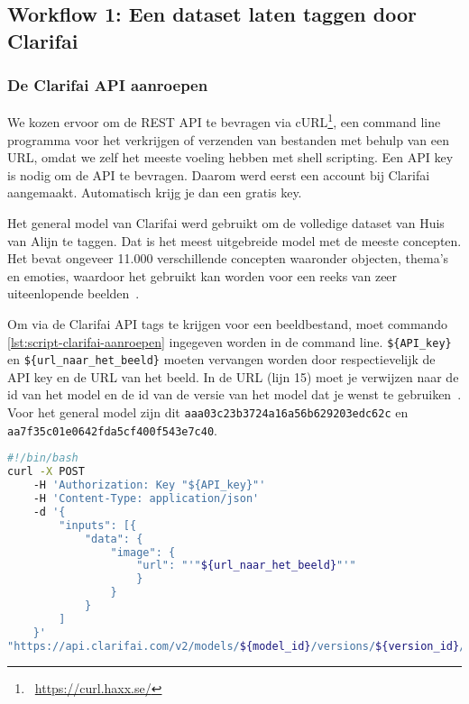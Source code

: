\subsection{Workflow 1: Een dataset laten taggen door Clarifai}
\label{subsec:workflow1}

\subsubsection{De Clarifai API aanroepen}
\label{(subsubsec:clarifai-aanroepen)}

We kozen ervoor om de REST API te bevragen via cURL\footnote{~\url{https://curl.haxx.se/}}, een command line programma voor het verkrijgen of verzenden van bestanden met behulp van een URL, omdat we zelf het meeste voeling hebben met shell scripting. Een API key is nodig om de API te bevragen. Daarom werd eerst een account bij Clarifai aangemaakt. Automatisch krijg je dan een gratis key. 

Het general model van Clarifai werd gebruikt om de volledige dataset van Huis van Alijn te taggen. Dat is het meest uitgebreide model met de meeste concepten. Het bevat ongeveer 11.000 verschillende concepten waaronder objecten, thema's en emoties, waardoor het gebruikt kan worden voor een reeks van zeer uiteenlopende beelden~\autocite{ClarifaiGeneral}.

Om via de Clarifai API tags te krijgen voor een beeldbestand, moet commando \ref{lst:script-clarifai-aanroepen} ingegeven worden in de command line. \texttt{\$\{API\_key\}} en \texttt{\$\{url\_naar\_het\_beeld\}} moeten vervangen worden door respectievelijk de API key en de URL van het beeld. In de URL (lijn 15) moet je verwijzen naar de id van het model en de id van de versie van het model dat je wenst te gebruiken~\autocite{ClarifaiAPI}. Voor het general model zijn dit \texttt{aaa03c23b3724a16a56b629203edc62c} en \texttt{aa7f35c01e0642fda5cf400f543e7c40}.

\begin{lstlisting}[language=bash,caption={Bash commando om een beeld door Clarifai te laten taggen.}, label=lst:script-clarifai-aanroepen]
#!/bin/bash
curl -X POST
    -H 'Authorization: Key "${API_key}"'
    -H 'Content-Type: application/json'
    -d '{
        "inputs": [{
            "data": {
                "image": { 
                    "url": "'"${url_naar_het_beeld}"'"
                    }
                }
            }
        ]
    }'
"https://api.clarifai.com/v2/models/${model_id}/versions/${version_id}/outputs"
\end{lstlisting}

